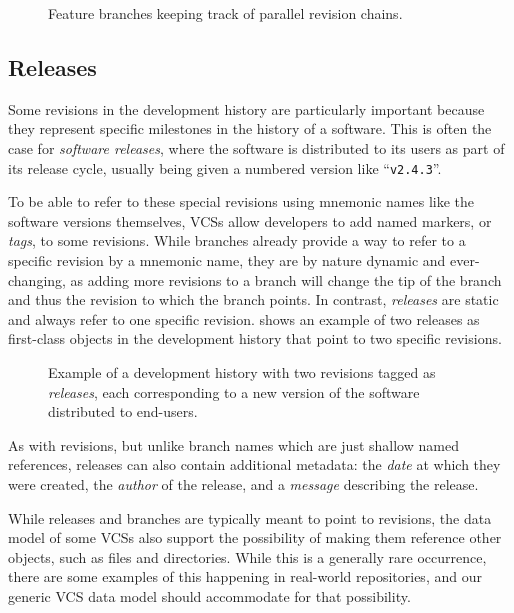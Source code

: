 \begin{figure}[b]
    \centering
    
    \caption{Feature branches keeping track of parallel revision chains.}%
    \label{fig:vcs-rev-branches}
\end{figure}

\subsection{Releases}

Some revisions in the development history are particularly important because
they represent specific milestones in the history of a software. This is often
the case for \emph{software releases}, where the software is distributed to
its users as part of its release cycle, usually being given a numbered version
like ``\texttt{v2.4.3}''.

To be able to refer to these special revisions using mnemonic names like the
software versions themselves, \glspl{VCS} allow developers to add named markers,
or \emph{tags}, to some revisions.
While branches already provide a way to refer to a specific revision by a
mnemonic name, they are by nature dynamic and ever-changing, as adding more
revisions to a branch will change the tip of the branch and thus the revision
to which the branch points. In contrast, \emph{releases} are static and always
refer to one specific revision.
 shows an example of two releases as first-class
objects in the development history that point to two specific revisions.

\begin{figure}
    \centering
    
    \caption{Example of a development history with two revisions tagged as
    \emph{releases}, each corresponding to a new version of the software
    distributed to end-users.}%
    \label{fig:vcs-rel-example}
\end{figure}

As with revisions, but unlike branch names which are just shallow named
references, releases can also contain additional metadata: the \emph{date} at
which they were created, the \emph{author} of the release, and a \emph{message}
describing the release.

While releases and branches are typically meant to point to revisions, the data
model of some \glspl{VCS} also support the possibility of making them reference
other objects, such as files and directories. While this is a generally rare
occurrence, there are some examples of this happening in real-world
repositories, and our generic \gls{VCS} data model should accommodate for that
possibility.

